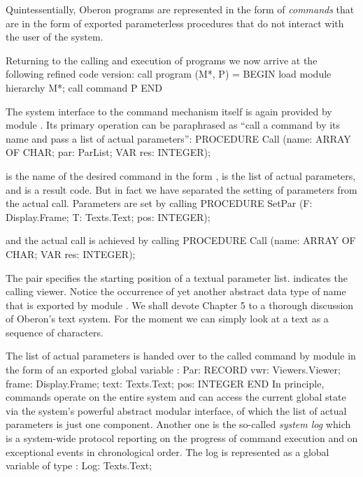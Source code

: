 Quintessentially, Oberon programs are represented in the form of
\emph{commands} that are in the form of exported parameterless procedures
that do not interact with the user of the system.

Returning to the calling and execution of programs we now arrive at
the following refined code version:
\begintt
call program (M*, P) = BEGIN
  load module hierarchy M*; call command P
END
\endtt

\noindent The system interface to the command mechanism itself is again provided
by module . Its primary operation can be paraphrased as
``call a command by its name and pass a list of actual parameters'':
\begintt
PROCEDURE Call (name: ARRAY OF CHAR; par: ParList;
                VAR res: INTEGER);
\endtt

\noindent {} is the name of the desired command in the form ,  is the
list of actual parameters, and  is a result code. But in fact we
have separated the setting of parameters from the actual
call. Parameters are set by calling
\begintt
PROCEDURE SetPar (F: Display.Frame; T: Texts.Text;
                  pos: INTEGER);
\endtt

\noindent and the actual call is achieved by calling
\begintt
PROCEDURE Call (name: ARRAY OF CHAR; VAR res: INTEGER);
\endtt

\noindent The pair  specifies the starting position of a textual
parameter list.  indicates the calling viewer. Notice the occurrence
of yet another abstract data type of name  that is exported by
module . We shall devote Chapter 5 to a thorough discussion of
Oberon's text system. For the moment we can simply look at a text as a
sequence of characters.

The list of actual parameters is handed over to the called command by
module  in the form of an exported global variable :
\begintt
Par: RECORD vwr: Viewers.Viewer;
       frame: Display.Frame;
       text: Texts.Text;
       pos: INTEGER
     END
\endtt
In principle, commands operate on the entire system and can access the
current global state via the system's powerful abstract modular
interface, of which the list of actual parameters is just one
component. Another one is the so-called \emph{system log} which is a
system-wide protocol reporting on the progress of command execution
and on exceptional events in chronological order. The log is
represented as a global variable of type :
\begintt
Log: Texts.Text;
\endtt

